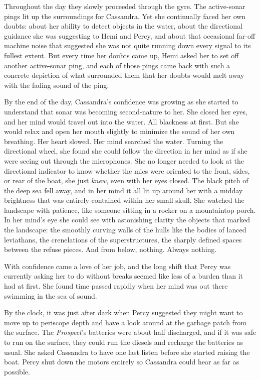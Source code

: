 \documentclass[
]{scrbook}
\begin{document}
\bigskip

Throughout the day they slowly proceeded through the gyre. The
active-sonar pings lit up the surroundings for Cassandra. Yet she
continually faced her own doubts: about her ability to detect objects in
the water, about the directional guidance she was suggesting to Hemi and
Percy, and about that occasional far-off machine noise that suggested
she was not quite running down every signal to its fullest extent. But
every time her doubts came up, Hemi asked her to set off another
active-sonar ping, and each of those pings came back with such a
concrete depiction of what surrounded them that her doubts would melt
away with the fading sound of the ping.

By the end of the day, Cassandra's confidence was growing as she started
to understand that sonar was becoming second-nature to her. She closed
her eyes, and her mind would travel out into the water. All blackness at
first. But she would relax and open her mouth slightly to minimize the
sound of her own breathing. Her heart slowed. Her mind searched the
water. Turning the directional wheel, she found she could follow the
direction in her mind as if she were seeing out through the microphones.
She no longer needed to look at the directional indicator to know
whether the mics were oriented to the front, sides, or rear of the boat,
she just \emph{knew}, even with her eyes closed. The black pitch of the
deep sea fell away, and in her mind it all lit up around her with a
midday brightness that was entirely contained within her small skull.
She watched the landscape with patience, like someone sitting in a
rocker on a mountaintop porch. In her mind's eye she could see with
astonishing clarity the objects that marked the landscape: the smoothly
curving walls of the hulls like the bodies of lanced leviathans, the
crenelations of the superstructures, the sharply defined spaces between
the refuse pieces. And from below, nothing. Always nothing.

With confidence came a love of her job, and the long shift that Percy
was currently asking her to do without breaks seemed like less of a
burden than it had at first. She found time passed rapidly when her mind
was out there swimming in the sea of sound.

By the clock, it was just after dark when Percy suggested they might
want to move up to periscope depth and have a look around at the garbage
patch from the surface. The \emph{Prospect}'s batteries were about half
discharged, and if it was safe to run on the surface, they could run the
diesels and recharge the batteries as usual. She asked Cassandra to have
one last listen before she started raising the boat. Percy shut down the
motors entirely so Cassandra could hear as far as possible.
\end{document}
